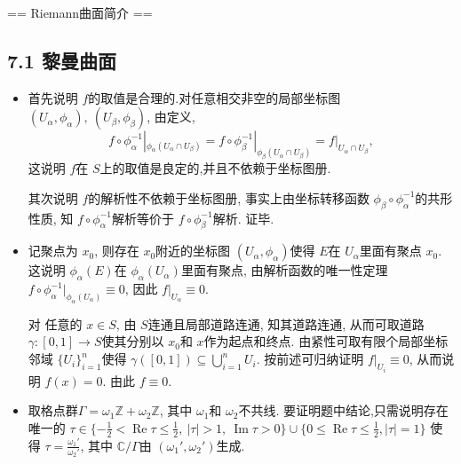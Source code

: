 \renewcommand{\Re}{\operatorname{Re}}
\renewcommand{\Im}{\operatorname{Im}}

\setcounter{section}{6}

== Riemann曲面简介 ==

\subsection*{7.1 黎曼曲面}
\begin{itemize}
    
    \item[7.1.1] 首先说明 $f$的取值是合理的.对任意相交非空的局部坐标图 
    $(U_\alpha,\phi_\alpha),\ (U_\beta,\phi_\beta)$, 由定义, 
    $$f\circ \phi_\alpha^{-1}|_{\phi_\alpha(U_\alpha \cap U_\beta)} 
    =  f\circ \phi_\beta^{-1}|_{\phi_\beta(U_\alpha \cap U_\beta)} 
    = f|_{U_\alpha \cap  U_\beta},$$
    这说明 $f$在 $S$上的取值是良定的,并且不依赖于坐标图册.

    其次说明 $f$的解析性不依赖于坐标图册, 事实上由坐标转移函数 
    $\phi_\beta \circ\phi_{\alpha}^{-1}$的共形性质, 
    知 $f\circ \phi_\alpha^{-1}$解析等价于 $f\circ \phi_\beta^{-1}$解析. 证毕.

    
    \item[7.1.2] 记聚点为 $x_0$, 则存在 $x_0$附近的坐标图 
    $(U_\alpha,\phi_\alpha)$使得 $E$在 $U_\alpha$里面有聚点 $x_0$. 
    这说明 $\phi_\alpha(E)$在 $\phi_\alpha(U_\alpha)$里面有聚点,
    由解析函数的唯一性定理 $f\circ \phi_\alpha^{-1}|_{\phi_\alpha(U_\alpha)} \equiv 0$,
    因此 $f|_{U_\alpha}\equiv 0$.
    
    对 任意的 $x \in S$, 由 $S$连通且局部道路连通, 知其道路连通, 
    从而可取道路$\gamma:[0,1]\to S$使其分别以 $x_0$和 $x$作为起点和终点. 
    由紧性可取有限个局部坐标邻域 $\{U_i\}_{i=1}^n$使得  
    $\gamma([0,1])\subseteq \bigcup_{i=1}^n U_i $. 
    按前述可归纳证明 $f|_{U_i}\equiv 0$, 从而说明 $f(x)=0$. 由此 $f\equiv 0.$ 

    
    \item[7.1.3] 取格点群$\Gamma = \omega_1 \mathbb{Z}+\omega_2 \mathbb{Z}$,
    其中 $\omega_1$和 $\omega_2$不共线.
    要证明题中结论,只需说明存在唯一的 
    $\tau \in \{-\frac{1}{2}<\Re\tau\le \frac{1}{2},\ |\tau|> 1,
    \ \Im\tau>0\}\cup \{0\le \Re\tau\le \frac{1}{2} , |\tau|=1\}$ 
    使得 $\tau = \frac{\omega_1'}{\omega_2'}$, 
    其中 $\mathbb{C}/\Gamma$由  $(\omega_1',\omega_2')$生成.
    

\end{itemize}
